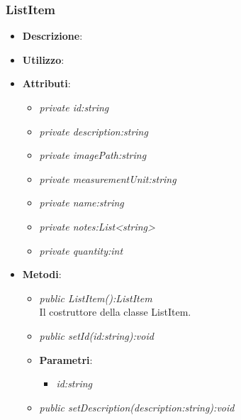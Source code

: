 \begin{itemize}
\subsubsection{ListItem}
\begin{itemize}
\item \textbf{Descrizione}:
\item \textbf{Utilizzo}:
\item \textbf{Attributi}: 
	\begin{itemize}
	\item \textit{private id:string}\\
	
	\item \textit{private description:string}\\
	
	\item \textit{private imagePath:string}\\
	
	\item \textit{private measurementUnit:string}\\
	
	\item \textit{private name:string}\\
	
	\item \textit{private notes:List<string>}\\
	
	\item \textit{private quantity:int}\\
	
	\end{itemize}
\item \textbf{Metodi}:
	\begin{itemize}
	\item \textit{public ListItem():ListItem}\\
	Il costruttore della classe ListItem.
	\item \textit{public setId(id:string):void}\\
	
				\item{\textbf{Parametri}: \begin{itemize}
				\item \textit{id:string}\\

			\end{itemize}}
	\item \textit{public setDescription(description:string):void}\\
	

\end{itemize}
\end{itemize}
\end{itemize}
